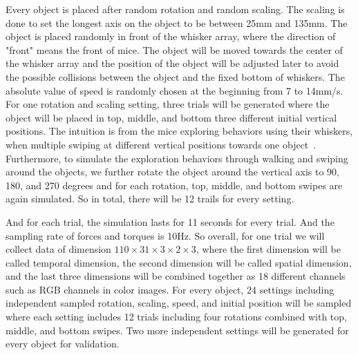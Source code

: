 Every object is placed after random rotation and random scaling. The scaling is done to set the longest axis on the object to be between 25mm and 135mm. The object is placed randomly in front of the whisker array, where the direction of "front" means the front of mice.
The object will be moved towards the center of the whisker array and the position of the object will be adjusted later to avoid the possible collisions between the object and the fixed bottom of whiskers.
The absolute value of speed is randomly chosen at the beginning from 7 to 14mm/s.
For one rotation and scaling setting, three trials will be generated where the object will be placed in top, middle, and bottom three different initial vertical positions. The intuition is from the mice exploring behaviors using their whiskers, when multiple swiping at different vertical positions towards one object~\cite{hobbs2015spatiotemporal}.
Furthermore, to simulate the exploration behaviors through walking and swiping around the objects, we further rotate the object around the vertical axis to 90, 180, and 270 degrees and for each rotation, top, middle, and bottom swipes are again simulated.
So in total, there will be 12 trails for every setting.

And for each trial, the simulation lasts for 11 seconds for every trial. And the sampling rate of forces and torques is 10Hz. 
So overall, for one trial we will collect data of dimension $110 \times 31 \times 3 \times 2 \times 3$, where the first dimension will be called temporal dimension, the second dimension will be called spatial dimension, and the last three dimensions will be combined together as 18 different channels such as RGB channels in color images.
For every object, 24 settings including independent sampled rotation, scaling, speed, and initial position will be sampled where each setting includes 12 trials including four rotations combined with top, middle, and bottom swipes. Two more independent settings will be generated for every object for validation.
